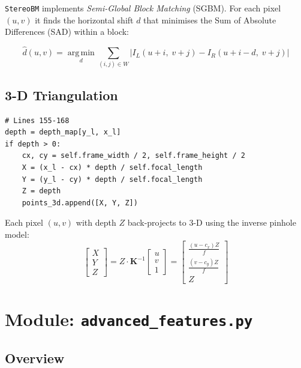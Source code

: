 \documentclass[12pt,a4paper,twoside]{report}
\theoremstyle{definition}
\newcommand{\mat}[1]{\mathbf{#1}}
\newcommand{\argmin}{\operatorname*{arg\,min}}
\newcommand{\abs}[1]{\left| #1 \right|}
\newcommand{\code}[1]{\texttt{#1}}
\begin{document}
\noindent \code{StereoBM} implements \emph{Semi-Global Block Matching} (SGBM).
For each pixel $(u,v)$ it finds the horizontal shift $d$ that minimises the
Sum of Absolute Differences (SAD) within a block:

\[
  \hat{d}(u,v) = \argmin_{d} \sum_{(i,j)\in W} \abs{I_L(u+i,\; v+j) - I_R(u+i-d,\; v+j)}
\]

\section{3-D Triangulation}

\begin{lstlisting}
# Lines 155-168
depth = depth_map[y_l, x_l]
if depth > 0:
    cx, cy = self.frame_width / 2, self.frame_height / 2
    X = (x_l - cx) * depth / self.focal_length
    Y = (y_l - cy) * depth / self.focal_length
    Z = depth
    points_3d.append([X, Y, Z])
\end{lstlisting}

Each pixel $(u,v)$ with depth $Z$ back-projects to 3-D using the inverse
pinhole model:
\[
  \begin{bmatrix}X\\Y\\Z\end{bmatrix} =
  Z \cdot \mat{K}^{-1} \begin{bmatrix}u\\v\\1\end{bmatrix} =
  \begin{bmatrix}\frac{(u-c_x)Z}{f} \\ \frac{(v-c_y)Z}{f} \\ Z\end{bmatrix}
\]

\chapter{Module: \texttt{advanced\_features.py}}

\section{Overview}
\end{document}
